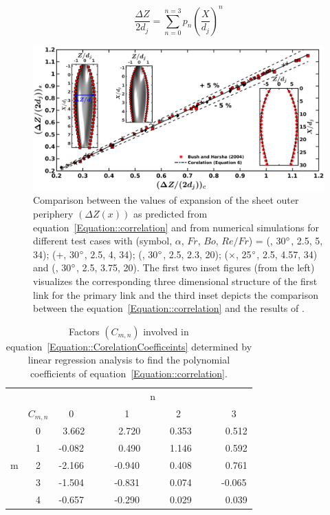 \documentclass[%
 aip,
 sd,%
amsmath,amssymb,
preprint,%
author-year,%
]{revtex4-1}
\begin{document}
\begin{equation}\label{Equation::correlation}
\frac{\Delta Z}{2d_j} = \sum_{n = 0}^{n = 3}p_n\left(\frac{X}{d_j}\right)^n
\end{equation}
\begin{figure}
	\centering
	\includegraphics[width=\linewidth]{Figure9}
	\caption{Comparison between the values of expansion of the sheet outer periphery $\left(\Delta Z(x)\right)$ as predicted from equation~\ref{Equation::correlation} and from numerical simulations for different test cases with (symbol, $\alpha$, $Fr$, $Bo$, $Re/Fr$) = (\protect\MarkerSquareRed, 30$\degree$, 2.5, 5, 34); (+, 30$\degree$, 2.5, 4, 34); (\protect \MarkerDiamondBlack, 30$\degree$, 2.5, 2.3, 20); ($\times$, 25$\degree$, 2.5, 4.57, 34) and (\protect \MarkerCircleRed, 30$\degree$, 2.5, 3.75, 20). The first two inset figures (from the left) visualizes the corresponding three dimensional structure of the first link for the primary link and the third inset depicts the comparison between the equation~\ref{Equation::correlation} and the results of \cite{bush2004collision}.}
	\label{Figure::polyfit}
\end{figure}
\begin{table}
	\centering
	\caption{Factors $\left(C_{m,n}\right)$ involved in equation~\ref{Equation::CorelationCoefficeints} determined by linear regression analysis to find the polynomial coefficients of equation~\ref{Equation::correlation}.}
	\label{Table::polyfit}
	\begin{tabular}{@{}cc|ccccccccc@{}}
		&   &     &   & & &n &      &    &   &        \\
		& $C_{m,n}$  & 0 &   &  & 1 &      & 2 & &   & 3      \\\hline
		& 0 & ~3.662&  & & ~2.720&  & ~0.353& & & ~0.512  \\
		& 1  & -0.082 &&  & ~0.490  & & ~1.146& & & ~0.592  \\
		m& 2 & -2.166 & & & -0.940& & ~0.408& & & ~0.761  \\
		& 3 & -1.504& & & -0.831& & ~0.074& & & -0.065 \\
		& 4 & -0.657& & & -0.290& & ~0.029&& & ~0.039  \\ 
	\end{tabular}
\end{table}
\end{document}
